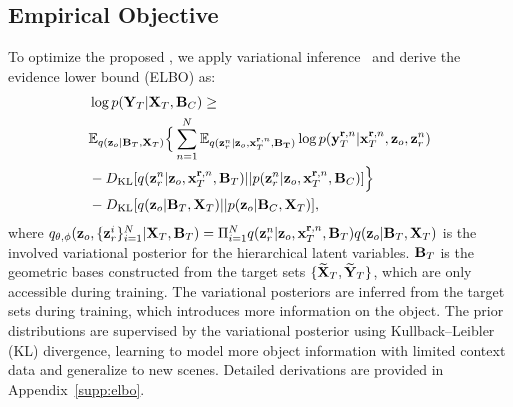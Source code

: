 
\subsection{Empirical Objective}
\label{sec: object}

To optimize the proposed \method{},
we apply variational inference~\citep{garnelo2018neural} and derive the evidence lower bound (ELBO) as:
\begin{equation}
\begin{aligned}
& \log   p({\bf{Y}}_{T}| {\bf{X}}_{T}, {\bf{B}}_{C})
\geq \\
&\mathbb{E}_{q({\bf{z}}_o | {\bf{B}}_T,  {\bf{X}}_T)}  \Big\{  \sum_{n=1}^{N}  \mathbb{E}_{q({\bf{z}}_r^n| {\bf{z}}_o,  {\bf{x}}_{T}^{\mathbf{r}, n}, {\bf{B}_T})} \log p({\bf{y}}_{T}^{{\mathbf{r}}, n}| {\bf{x}}_{T}^{{\mathbf{r}}, n}, {\bf{z}}_o, {\bf{z}}_r^n) \\
&- D_{\text{KL}}[q({\bf{z}}_r^n| {\bf{z}}_o,  {\bf{x}}_{T}^{{\mathbf{r}}, n}, {{\bf{B}}_T}) || p({\bf{z}}_r^n| {\bf{z}}_o,  {\bf{x}}_{T}^{{\mathbf{r}}, n}, {{\bf{B}}_C}) ] \Big\} \\
& - D_{\text{KL}}[q({\bf{z}}_o | {\bf{B}}_T,  {\bf{X}}_T) || p({\bf{z}}_o | {\bf{B}}_C,  {\bf{X}}_T)], \\
\end{aligned}
\end{equation}
where $q_{\theta, \phi}({\bf{z}}_o,  \{{\bf{z}}_r^i\}_{i=1}^{N} | {\bf{X}}_T, {\bf{B}}_T) = \Pi_{i=1}^{N}q({\bf{z}}_r^n| {\bf{z}}_o,  {\bf{x}}_{T}^{{\mathbf{r}}, n}, {{\bf{B}}_T}) q({\bf{z}}_o | {\bf{B}}_T,  {\bf{X}}_T)$ is the involved variational posterior for the hierarchical latent variables.  ${\bf{B}}_T$ is the geometric bases constructed from the target sets $\{{\bf{\widetilde{X}}}_{T}, {\bf{\widetilde{Y}}}_{T}\}$, which are only accessible during training. 
The variational posteriors are inferred from the target sets during training, which introduces more information on the object. 
The prior distributions are supervised by the variational posterior using Kullback–Leibler (KL) divergence, learning to model more object information with limited context data and generalize to new scenes. Detailed derivations are provided in Appendix~\ref{supp:elbo}.

